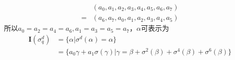 \begin{enumerate}
\begin{solution}
\begin{tcolorbox}
            \begin{equation*}
                \begin{aligned}
                    &(a_0,a_1,a_2,a_3,a_4,a_5,a_6,a_7)\\
                    =&(a_6,a_7,a_0,a_1,a_2,a_3,a_4,a_5)
                \end{aligned}
            \end{equation*}
            所以$a_0=a_2=a_4=a_6,a_1=a_3=a_5=a_7$，$\alpha$可表示为
            \begin{equation*}
                \begin{aligned}
                    \textbf{I}(\sigma_q^d)&=\{\alpha|\sigma^d(\alpha)=\alpha\}\\
                    &=\{a_0\gamma+a_1\sigma(\gamma)|\gamma=\beta+\sigma^{2}(\beta)+\sigma^{4}(\beta)+\sigma^{6}(\beta)\}
                \end{aligned}
            \end{equation*}
        \end{tcolorbox}
    \end{solution}
\end{enumerate}